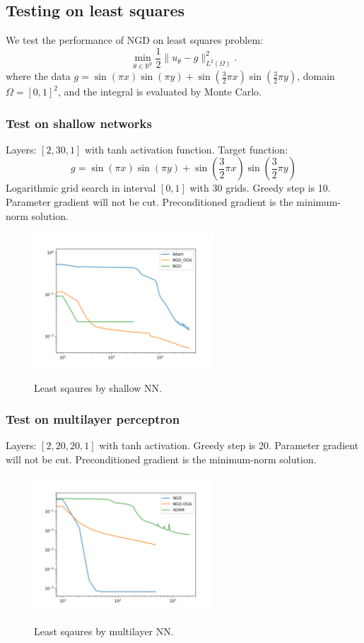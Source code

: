 \documentclass{article}
\begin{document}
\subsection{Testing on least squares}
We test the performance of NGD on least squares problem:
\[
    \min_{\theta\in\mathbb{R}^p} \frac{1}{2}\|u_\theta-g\|^2_{L^2(\Omega)}.
\]
where the data $g=\sin(\pi x)\sin(\pi y )+\sin(\frac{3}{2}\pi x)\sin(\frac{3}{2}\pi y)$, domain $\Omega=[0,1]^2$, and the integral is evaluated by Monte Carlo.

\subsubsection*{Test on shallow networks}
Layers: $[2,30,1]$ with tanh activation function. Target function:
\[
    g = \sin(\pi x)\sin(\pi y )+\sin(\frac{3}{2}\pi x)\sin(\frac{3}{2}\pi y)
\]
Logarithmic grid search in interval $[0,1]$ with 30 grids. Greedy step is 10. Parameter gradient will not be cut. Preconditioned gradient is the 
minimum-norm solution.

\begin{figure}[hbt]
    \centering
    \includegraphics[width=0.6\textwidth]{figures/ls_plot.png}
\label{fig:lsplot}
\caption{Least sqaures by shallow NN.}
\end{figure}

\subsubsection*{Test on multilayer perceptron}
Layers: $[2,20,20,1]$ with tanh activation. Greedy step is 20. Parameter gradient will not be cut. Preconditioned gradient is the minimum-norm solution. 

\begin{figure}[hbt]
    \centering
    \includegraphics[width=0.6\textwidth]{figures/ls_mlp.png}
\label{fig:lsplot2}
\caption{Least sqaures by multilayer NN.}
\end{figure}
\end{document}
